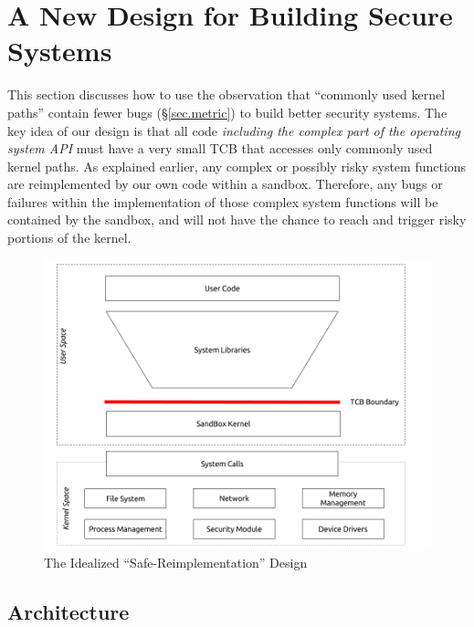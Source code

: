 \section{A New Design for Building Secure Systems}
\label{sec.design}

This section discusses how to use the observation
 that ``commonly used kernel paths'' contain fewer bugs 
(\S{\ref{sec.metric}}) to build better security systems.
The key idea of our design is that all code \emph{including the complex part
of the operating system API} must have a very small TCB that accesses only 
commonly used kernel paths. 
As explained earlier, any complex or possibly risky system functions 
are reimplemented by our own code within a sandbox. 
Therefore, any bugs or failures within the implementation of those complex system functions 
will be contained by the sandbox, and will not have the chance to reach 
and trigger risky portions of the kernel. 


\begin{figure}%
\centering
\includegraphics[width=1.0\columnwidth]{diagram/fig3.png}
\caption{The Idealized ``Safe-Reimplementation'' Design }
\label{fig:design}
\end{figure}

\subsection{Architecture}

